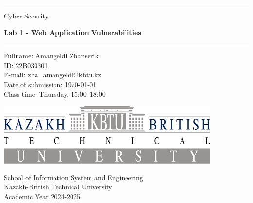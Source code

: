 \documentclass[12pt]{article}
\begin{document}
\begin{titlepage}
    \centering

    \vspace*{1cm}

    \rule{\textwidth}{1pt}

    \vspace{2\baselineskip}

    {\huge  Cyber Security } \\

    \vspace{1\baselineskip}

    {\huge \textbf{ Lab 1 - Web Application Vulnerabilities }}

    \vspace{2\baselineskip}

    \rule{\textwidth}{1pt}

    \vspace{1cm}

    \large

    \begin{flushleft}
        \begin{minipage}{.8\textwidth}
            \raggedright
            Fullname: Amangeldi Zhanserik \\
            ID: 22B030301 \\
            E-mail: {\normalsize \url{zha_amangeldi@kbtu.kz}} \\
            Date of submission: \today \\
            Class time: Thursday, 15:00--18:00 \\
        \end{minipage}%
    \end{flushleft}

    \vspace{2cm}

    \includegraphics[width=.7\textwidth]{logo-kbtu.png}

    \vfill

    School of Information System and Engineering \\
    Kazakh-British Technical University \\
    Academic Year 2024-2025 \\
\end{titlepage}
\end{document}

